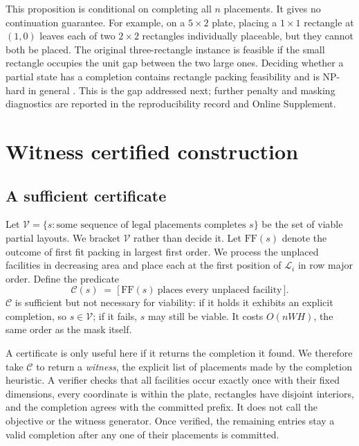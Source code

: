\documentclass[preprint,12pt,authoryear,nonatbib]{elsarticle}
\newcommand{\cL}{\mathcal{L}}
\newcommand{\cV}{\mathcal{V}}
\newcommand{\cC}{\mathcal{C}}
\begin{document}
This proposition is conditional on completing all $n$ placements. It gives no
continuation guarantee. For example, on a $5\times2$ plate, placing a $1\times1$
rectangle at $(1,0)$ leaves each of two $2\times2$ rectangles individually
placeable, but they cannot both be placed. The original three-rectangle instance
is feasible if the small rectangle occupies the unit gap between the two large
ones. Deciding whether a partial state has a completion contains rectangle
packing feasibility and is NP-hard in general \citep{Fowler1981Packing}. This is
the gap addressed next; further penalty and masking diagnostics are reported
in the reproducibility record and Online Supplement.

\section{Witness certified construction}
\label{sec:certified}

\subsection{A sufficient certificate}
Let $\cV=\{s:\text{some sequence of legal placements completes }s\}$ be the
set of viable partial layouts. We bracket $\cV$ rather than decide it. Let
$\mathrm{FF}(s)$ denote the outcome of
first fit packing in largest first order. We process the unplaced facilities in decreasing
area and place each at the first position of $\cL_i$ in row major order. Define
the predicate
\begin{equation}
\cC(s)\;=\;\big[\,\mathrm{FF}(s)\ \text{places every unplaced facility}\,\big].
\end{equation}
$\cC$ is sufficient but not necessary for viability: if it holds it exhibits an
explicit completion, so $s\in\cV$; if it fails, $s$ may still be viable. It costs
$O(nWH)$, the same order as the mask itself.

A certificate is only useful here if it returns the completion it found. We
therefore take $\cC$ to return a \emph{witness}, the explicit list of placements
made by the completion heuristic. A verifier checks that all facilities occur
exactly once with their fixed dimensions, every coordinate is within the plate,
rectangles have disjoint interiors, and the completion agrees with the committed
prefix. It does not call the objective or the witness generator. Once verified,
the remaining entries stay a valid completion after any one of their placements
is committed.
\end{document}
